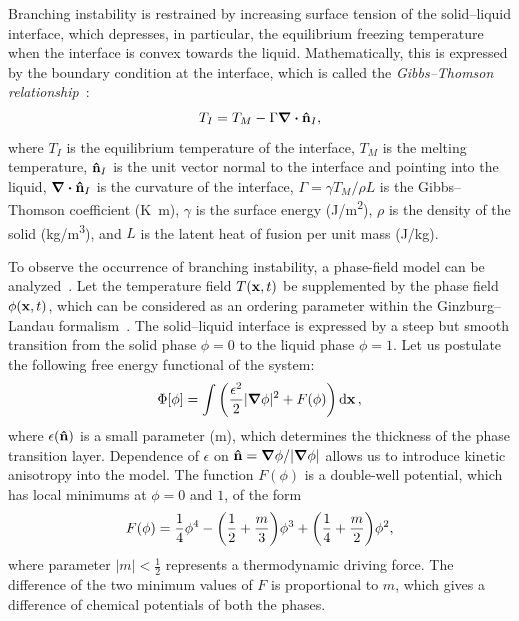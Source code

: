 \documentclass{article}
\begin{document}
Branching instability is restrained by increasing surface tension of the solid--liquid interface,
which depresses, in particular, the equilibrium freezing temperature when the interface is convex towards the liquid.
Mathematically, this is expressed by the boundary condition at the interface,
which is called the \emph{Gibbs--Thomson relationship}~\cite{worster2000solidification}:
\begin{equation}\label{eq:Gibbs--Thomson}
    T_I = T_M - \Gamma\div\vu{n}_I,
\end{equation}
where $T_I$ is the equilibrium temperature of the interface, $T_M$ is the melting temperature,
$\vu{n}_I$ is the unit vector normal to the interface and pointing into the liquid,
$\div\vu{n}_I$ is the curvature of the interface,
$\Gamma = \gamma T_M/\rho L$ is the Gibbs--Thomson coefficient (\si{K.m}),
$\gamma$ is the surface energy (\si{J/m^2}), $\rho$ is the density of the solid (\si{kg/m^3}),
and $L$ is the latent heat of fusion per unit mass (\si{J/kg}).

To observe the occurrence of branching instability, a phase-field model can be analyzed~\cite{kobayashi1993modeling}.
Let the temperature field $T(\vb{x},t)$ be supplemented by the phase field $\phi(\vb{x},t)$,
which can be considered as an ordering parameter within the Ginzburg--Landau formalism~\cite{landau1950theory}.
The solid--liquid interface is expressed by a steep but smooth transition from the solid phase $\phi=0$
to the liquid phase $\phi=1$.
Let us postulate the following free energy functional of the system:
\begin{equation}\label{eq:Ginzburg--Landau}
    \Phi[\phi] = \int\qty(\frac{\epsilon^2}2|\grad\phi|^2 + F(\phi))\dd{\vb{x}},
\end{equation}
where $\epsilon(\vu{n})$ is a small parameter (\si{m}), which determines the thickness of the phase transition layer.
Dependence of $\epsilon$ on $\vu{n}=\grad\phi/|\grad\phi|$ allows us to introduce kinetic anisotropy into the model.
The function $F(\phi)$ is a double-well potential, which has local minimums at $\phi=0$ and $1$, of the form
\begin{equation}\label{eq:F}
    F(\phi) = \frac14\phi^4 - \qty(\frac12 + \frac{m}3)\phi^3 + \qty(\frac14 + \frac{m}2)\phi^2,
\end{equation}
where parameter $|m|<\frac12$ represents a thermodynamic driving force.
The difference of the two minimum values of $F$ is proportional to $m$,
which gives a difference of chemical potentials of both the phases.
\end{document}
